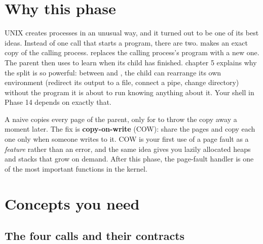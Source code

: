 \documentclass[11pt,a4paper]{article}
\begin{document}


\section{Why this phase}

UNIX creates processes in an unusual way, and it turned out to be one of its best ideas. Instead of one call that
starts a program, there are two.  makes an exact copy of the calling process.  replaces the
calling process's program with a new one. The parent then uses  to learn when its child has finished.
\OSTEP chapter 5 explains why the split is so powerful: between  and , the child can rearrange
its own environment (redirect its output to a file, connect a pipe, change directory) without the program it is about
to run knowing anything about it. Your shell in Phase 14 depends on exactly that.

A naive  copies every page of the parent, only for  to throw the copy away a moment later. The
fix is \textbf{copy-on-write} (COW): share the pages and copy each one only when someone writes to it. COW is your
first use of a page fault as a \emph{feature} rather than an error, and the same idea gives you lazily allocated heaps
and stacks that grow on demand. After this phase, the page-fault handler is one of the most important functions in
the kernel.

\section{Concepts you need}

\subsection{The four calls and their contracts}
\end{document}
